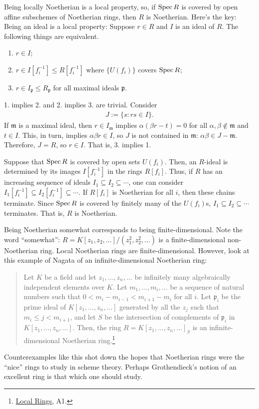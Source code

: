 \documentclass [11 pt, oneside] {article}
\begin{document}
\begin{remark}
	Being locally Noetherian is a local property, so, if $\operatorname{Spec} R$ is covered by open affine subschemes of Noetherian rings, then $R$ is Noetherian. Here's the key: Being an ideal is a local property: Suppose $r\in R$ and $I$ is an ideal of $R$. The following things are equivalent.
	\begin{enumerate}
		\item $r\in I$;
		\item $r\in I[f_i^{-1}]\le R[f_i^{-1}]$ where $\{U({f_i})\}$ covers $\operatorname{Spec} R$;
		\item $r\in I_{\mathfrak{p}}\le R_{\mathfrak{p}}$ for all maximal ideals $\mathfrak{p}$.
	\end{enumerate}
	1. implies 2. and 2. implies 3. are trivial. Consider
	\begin{align*}
		J := \{ s : rs \in I\}.
	\end{align*}
	If $\mathfrak{m}$ is a maximal ideal, then $r\in I_{\mathfrak{m}}$ implies $\alpha(\beta r - t) =0$ for all $\alpha,\beta\notin \mathfrak{m}$ and $t\in I$. This, in turn, implies $\alpha\beta r\in I$, so $J$ is not contained in $\mathfrak{m}$: $\alpha\beta\in J-\mathfrak{m}$. Therefore, $J=R$, so $r\in I$. That is, 3. implies 1.

Suppose that $\operatorname{Spec} R$ is covered by open sets $U({f_i})$. Then, an $R$-ideal is determined by its images $I[f_i^{-1}]$ in the rings $R[f_i]$. Thus, if $R$ has an increasing sequence of ideals $I_1\subseteq I_2\subseteq \cdots$, one can consider $I_1[f_i^{-1}]\subseteq I_2[f_i^{-1}]\subseteq\cdots$. If $R[f_i]$ is Noetherian for all $i$, then these chains terminate. Since $\operatorname{Spec} R$ is covered by finitely many of the $U({f_i})$s, $I_1\subseteq I_2\subseteq \cdots$ terminates. That is, $R$ is Noetherian.  
\end{remark}

\begin{remark}
	Being Noetherian somewhat corresponds to being finite-dimensional. Note the word ``somewhat'': $R = K[z_1,z_2,\hdots]/(z_1^2,z_2^2,\hdots)$ is a finite-dimensional non-Noetherian ring. Local Noetherian rings are finite-dimensional. However, look at this example of Nagata of an infinite-dimensional Noetherian ring:
\begin{quote}
\small
Let $K$ be a field and let $z_1,\hdots, z_n,\hdots$ be infinitely many algebraically independent elements over $K$. Let $m_1,\hdots, m_i,\hdots$ be a sequence of natural numbers such that $0<m_i-m_{i-1} < m_{i+1}-m_i$ for all $i$. Let $\mathfrak{p}_i$ be the prime ideal of $K[z_1,\hdots, z_n,\hdots]$ generated by all the $z_j$ such that $m_i\le j<m_{i+1}$, and let $S$ be the intersection of complements of $\mathfrak{p}_i$ in $K[z_1,\hdots, z_n,\hdots]$. Then, the ring $R = K[z_1,\hdots, z_n,\hdots]_S$ is an infinite-dimensional Noetherian ring.\footnote{\ul{Local Rings}, A1.}
\end{quote}

	Counterexamples like this shot down the hopes that Noetherian rings were the ``nice'' rings to study in scheme theory. Perhaps Grothendieck's notion of an excellent ring is that which one should study.
\end{remark}
\end{document}
